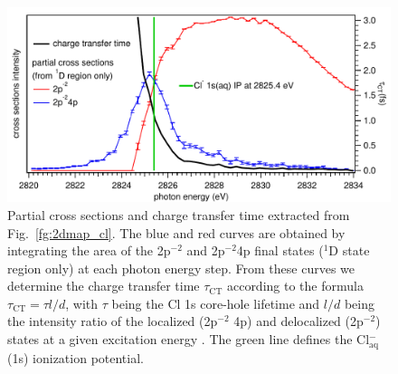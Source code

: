 \documentclass[journal=jacsat,manuscript=article]{achemso}
\begin{document}
\begin{figure}
\centering
\includegraphics[scale=0.9]{figures/partial_cross_sec_ct_time.pdf}
\caption{Partial cross sections and charge transfer time extracted from Fig.\ \ref{fg:2dmap_cl}. The blue and red curves are obtained by integrating the area of the 2p$^{-2}$ and 2p$^{-2}$4p final states ($^1$D state region only) at each photon energy step. From these curves we determine the charge transfer time $\tau_{\text{CT}}$ according to the formula $\tau_{\text{CT}} = \tau l/d$, with $\tau$ being the Cl 1s core-hole lifetime and $l/d$ being the intensity ratio of the localized (2p$^{-2}$ 4p) and delocalized (2p$^{-2}$) states at a given excitation energy \cite{foehlisch05:373}.  The green line defines the Cl$^{-}_{\text{aq}}$(1s) ionization potential.}
\label{fg:si_ct_time}
\end{figure}



%
\end{document}
